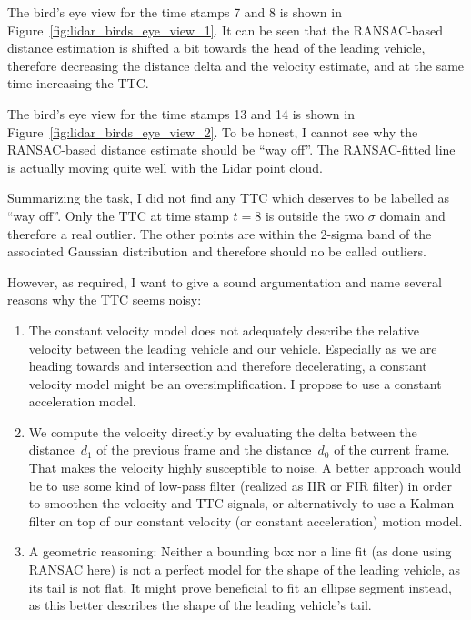 \documentclass[a4paper]{scrartcl}
\begin{document}
The bird's eye view for the time stamps 7 and 8
is shown in Figure~\ref{fig:lidar_birds_eye_view_1}.
It can be seen that the RANSAC-based distance estimation
is shifted a bit towards the head of the leading
vehicle, therefore decreasing the distance
delta and the velocity estimate, and at the same
time increasing the TTC.

The bird's eye view for the time stamps 13 and 14
is shown in Figure~\ref{fig:lidar_birds_eye_view_2}.
To be honest, I cannot see why the RANSAC-based
distance estimate should be ``way off''.
The RANSAC-fitted line is actually moving quite
well with the Lidar point cloud.

Summarizing the task, I did not find any TTC which
deserves to be labelled as ``way off''.
Only the TTC at time stamp $t=8$ is outside the
two $\sigma$ domain and therefore a real outlier.
The other points are within the 2-sigma band of the
associated Gaussian distribution and therefore should no
be called outliers.

However, as required,
I want to give a sound argumentation and
name several reasons why the TTC seems noisy:
\begin{enumerate}
	\item The constant velocity model does not adequately
		describe the relative velocity between the leading
		vehicle and our vehicle.
		Especially as we are heading towards and intersection
		and therefore decelerating, a constant velocity
		model might be an oversimplification.
		I propose to use a constant acceleration model.
	\item We compute the velocity directly by
		evaluating the delta between the distance~$d_1$
		of the previous frame and the distance~$d_0$
		of the current frame.
		That makes the velocity highly susceptible to noise.
		A better approach would be to use some kind of
		low-pass filter
		(realized as IIR or FIR filter) in order to smoothen the
		velocity and TTC signals, or alternatively
		to use a Kalman filter on top of our
		constant velocity (or constant acceleration)
		motion model.
	\item A geometric reasoning:
		Neither a bounding box nor a line fit
		(as done using RANSAC here) is not a perfect model
		for the shape of the leading vehicle, as its
		tail is not flat.
		It might prove beneficial to fit an ellipse
		segment instead, as this better describes the
		shape of the leading vehicle's tail.
\end{enumerate}
\end{document}
